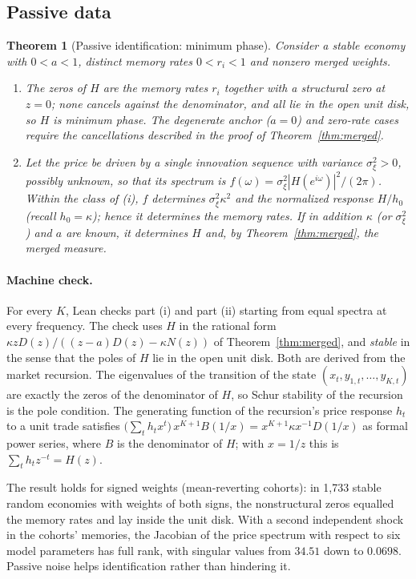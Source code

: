 \documentclass[12pt]{article}
\newtheorem{theorem}{Theorem}[section]
\theoremstyle{definition}
\theoremstyle{remark}
\begin{document}
\subsection{Passive data}

\begin{theorem}[Passive identification: minimum phase]\label{thm:minphase}
Consider a stable economy with $0<a<1$, distinct memory rates $0<r_i<1$ and nonzero merged weights.
\begin{enumerate}[label=(\roman*)]
\item The zeros of $H$ are the memory rates $r_i$ together with a structural zero at $z=0$; none cancels against the denominator, and all lie in the open unit disk, so $H$ is minimum phase. The degenerate anchor ($a=0$) and zero-rate cases require the cancellations described in the proof of Theorem~\ref{thm:merged}.
\item Let the price be driven by a single innovation sequence with variance $\sigma_\xi^2>0$, possibly unknown, so that its spectrum is $f(\omega)=\sigma_\xi^2|H(e^{i\omega})|^2/(2\pi)$. Within the class of (i), $f$ determines $\sigma_\xi^2\kappa^2$ and the normalized response $H/h_0$ (recall $h_0=\kappa$); hence it determines the memory rates. If in addition $\kappa$ (or $\sigma_\xi^2$) and $a$ are known, it determines $H$ and, by Theorem~\ref{thm:merged}, the merged measure.
\end{enumerate}
\end{theorem}

\paragraph{Machine check.} For every $K$, Lean checks part (i) and part (ii) starting from equal spectra at every frequency. The check uses $H$ in the rational form $\kappa zD(z)/((z-a)D(z)-\kappa N(z))$ of Theorem~\ref{thm:merged}, and \emph{stable} in the sense that the poles of $H$ lie in the open unit disk. Both are derived from the market recursion. The eigenvalues of the transition of the state $(x_t,y_{1,t},\ldots,y_{K,t})$ are exactly the zeros of the denominator of $H$, so Schur stability of the recursion is the pole condition. The generating function of the recursion's price response $h_t$ to a unit trade satisfies $\bigl(\sum_th_tx^t\bigr)\,x^{K+1}B(1/x)=x^{K+1}\kappa x^{-1}D(1/x)$ as formal power series, where $B$ is the denominator of $H$; with $x=1/z$ this is $\sum_th_tz^{-t}=H(z)$.

The result holds for signed weights (mean-reverting cohorts): in 1,733 stable random economies with weights of both signs, the nonstructural zeros equalled the memory rates and lay inside the unit disk. With a second independent shock in the cohorts' memories, the Jacobian of the price spectrum with respect to six model parameters has full rank, with singular values from $34.51$ down to $0.0698$. Passive noise helps identification rather than hindering it.
\end{document}
